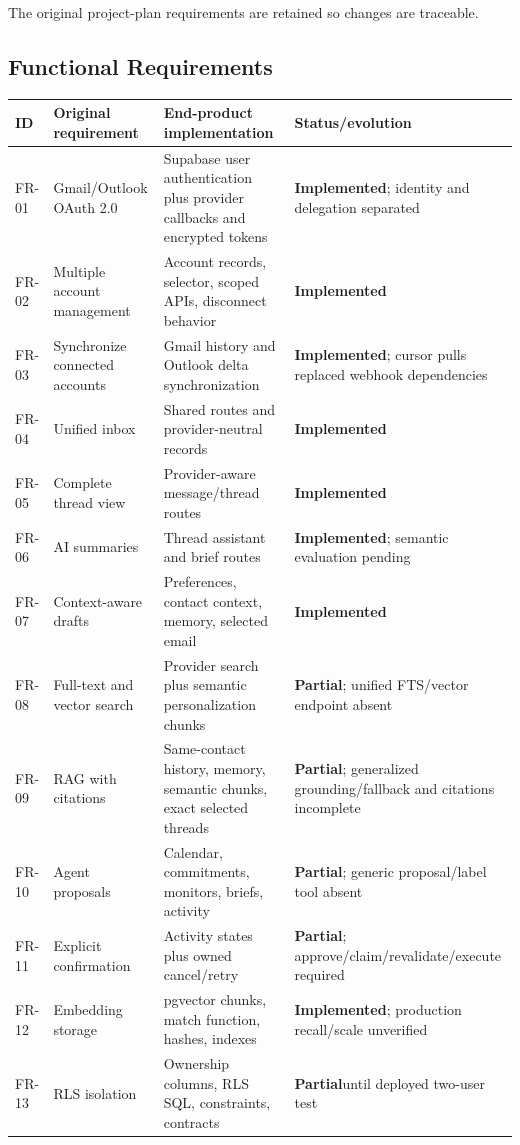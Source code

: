 \documentclass[11pt]{article}
\newcommand{\implemented}{\textbf{Implemented}}
\newcommand{\partialstatus}{\textbf{Partial}}
\begin{document}
The original project-plan requirements are retained so changes are traceable.

\subsection{Functional Requirements}

\begin{longtable}{@{}p{}p{}p{}p{}@{}}
\toprule
ID & Original requirement & End-product implementation & Status/evolution \\
\midrule
\endhead
\bottomrule
\endlastfoot
FR-01 & Gmail/Outlook OAuth 2.0 & Supabase user authentication plus provider callbacks and encrypted tokens & \implemented; identity and delegation separated \\
FR-02 & Multiple account management & Account records, selector, scoped APIs, disconnect behavior & \implemented \\
FR-03 & Synchronize connected accounts & Gmail history and Outlook delta synchronization & \implemented; cursor pulls replaced webhook dependencies \\
FR-04 & Unified inbox & Shared routes and provider-neutral records & \implemented \\
FR-05 & Complete thread view & Provider-aware message/thread routes & \implemented \\
FR-06 & AI summaries & Thread assistant and brief routes & \implemented; semantic evaluation pending \\
FR-07 & Context-aware drafts & Preferences, contact context, memory, selected email & \implemented \\
FR-08 & Full-text and vector search & Provider search plus semantic personalization chunks & \partialstatus; unified FTS/vector endpoint absent \\
FR-09 & RAG with citations & Same-contact history, memory, semantic chunks, exact selected threads & \partialstatus; generalized grounding/fallback and citations incomplete \\
FR-10 & Agent proposals & Calendar, commitments, monitors, briefs, activity & \partialstatus; generic proposal/label tool absent \\
FR-11 & Explicit confirmation & Activity states plus owned cancel/retry & \partialstatus; approve/claim/revalidate/execute required \\
FR-12 & Embedding storage & pgvector chunks, match function, hashes, indexes & \implemented; production recall/scale unverified \\
FR-13 & RLS isolation & Ownership columns, RLS SQL, constraints, contracts & \partialstatus until deployed two-user test \\
\end{longtable}
\end{document}

